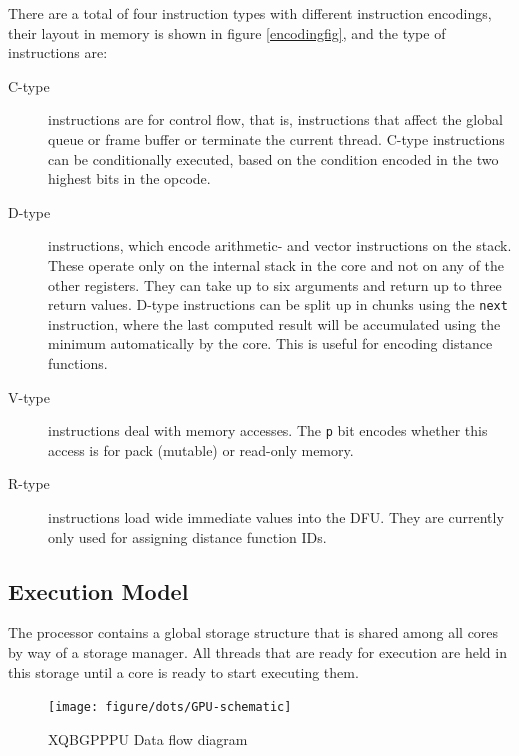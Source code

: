 			There are a total of four instruction types with different
			instruction encodings, their layout in memory is shown in figure
			\ref{encodingfig}, and the type of instructions are:

			\begin{description}
				\item[C-type] instructions are for control flow, that is, 
					instructions that affect the global queue or frame buffer or
					terminate the current thread. C-type instructions can be 
					conditionally executed, based on the condition encoded in
					the two highest bits in the opcode. 

				\item[D-type] instructions, which encode arithmetic- and vector
					instructions on the stack. These operate only on the
					internal stack in the core and not on any of the other
					registers. They can take up to six arguments and return up
					to three return values. D-type instructions can be split up
					in chunks using the \texttt{next} instruction, where the
					last computed result will be accumulated using the minimum
					automatically by the core.  This is useful for encoding
					distance functions.

				\item[V-type] instructions deal with memory accesses. The
					\texttt{p} bit encodes whether this access is for pack
					(mutable) or read-only memory.

				\item[R-type] instructions load wide immediate values into the
					DFU. They are currently only used for assigning distance
					function IDs.
			\end{description}

		\subsection{Execution Model}

			The processor contains a global storage structure that is shared
			among all cores by way of a storage manager. All threads that are 
			ready for execution are held in this storage until a core is ready 
			to start executing them.

			\begin{figure}[H]
				\centering
				\caption{ XQBGPPPU Data flow diagram }
				\texttt{[image: figure/dots/GPU-schematic]} 
				\vspace{-4pt}
			\end{figure}
	
